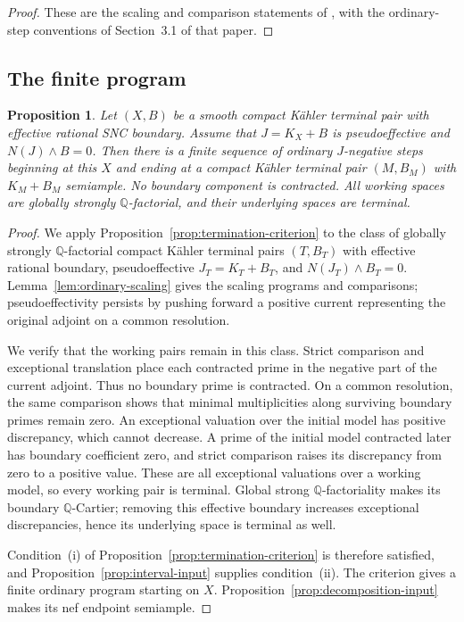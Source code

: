 \documentclass[11pt,a4paper]{article}
\numberwithin{equation}{section}
\newtheorem{proposition}[theorem]{Proposition}
\theoremstyle{definition}
\theoremstyle{remark}
\newcommand{\Q}{\mathbb Q}\newcommand{\R}{\mathbb R}
\begin{document}
\begin{proof}
These are the scaling and comparison statements of
\cite[Lemmas~3.6--3.7]{OAI034}, with the ordinary-step conventions
of Section~3.1 of that paper.
\end{proof}

\subsection{The finite program}

\begin{proposition}\label{prop:finite}
Let $(X,B)$ be a smooth compact Kähler terminal pair with effective
rational SNC boundary. Assume that $J=K_X+B$ is pseudoeffective and
$N(J)\wedge B=0$. Then there is a finite sequence of ordinary
$J$-negative steps beginning at this $X$ and ending at a compact Kähler
terminal pair $(M,B_M)$ with $K_M+B_M$ semiample. No boundary component
is contracted. All working spaces are globally strongly
$\Q$-factorial, and their underlying spaces are terminal.
\end{proposition}

\begin{proof}
We apply Proposition~\ref{prop:termination-criterion} to the class
of globally strongly $\Q$-factorial compact Kähler terminal pairs
$(T,B_T)$ with effective rational boundary, pseudoeffective
$J_T=K_T+B_T$, and $N(J_T)\wedge B_T=0$.
Lemma~\ref{lem:ordinary-scaling} gives the scaling programs and comparisons;
pseudoeffectivity persists by pushing forward a positive current
representing the original adjoint on a common resolution.

We verify that the working pairs remain in this class. Strict
comparison and exceptional translation place each contracted prime
in the negative part of the current adjoint. Thus no boundary prime
is contracted. On a common resolution, the same comparison shows
that minimal multiplicities along surviving boundary primes remain
zero. An exceptional valuation over the initial model has positive
discrepancy, which cannot decrease. A prime of the initial model
contracted later has boundary coefficient zero, and strict comparison
raises its discrepancy from zero to a positive value. These are all
exceptional valuations over a working model, so every working pair
is terminal. Global strong $\Q$-factoriality makes its boundary
$\Q$-Cartier; removing this effective boundary increases exceptional
discrepancies, hence its underlying space is terminal as well.

Condition~\textup{(i)} of
Proposition~\ref{prop:termination-criterion} is therefore satisfied,
and Proposition~\ref{prop:interval-input} supplies condition~\textup{(ii)}.
The criterion gives a finite ordinary program starting on $X$.
Proposition~\ref{prop:decomposition-input} makes its nef endpoint
semiample.
\end{proof}
\end{document}
